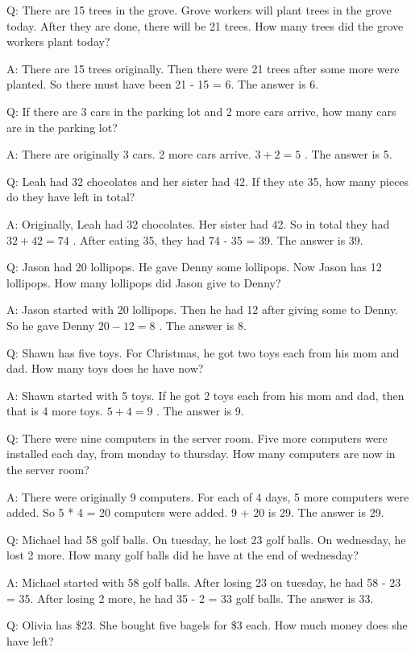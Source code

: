 \documentclass[
]{article}
\begin{document}
Q: There are 15 trees in the grove. Grove workers will plant trees in
the grove today. After they are done, there will be 21 trees. How many
trees did the grove workers plant today?

A: There are 15 trees originally. Then there were 21 trees after some
more were planted. So there must have been 21 - 15 = 6. The answer is 6.

Q: If there are 3 cars in the parking lot and 2 more cars arrive, how
many cars are in the parking lot?

A: There are originally 3 cars. 2 more cars arrive. \(3 + 2 = 5\) . The
answer is 5.

Q: Leah had 32 chocolates and her sister had 42. If they ate 35, how
many pieces do they have left in total?

A: Originally, Leah had 32 chocolates. Her sister had 42. So in total
they had \(32 + 42 = 74\) . After eating 35, they had 74 - 35 = 39. The
answer is 39.

Q: Jason had 20 lollipops. He gave Denny some lollipops. Now Jason has
12 lollipops. How many lollipops did Jason give to Denny?

A: Jason started with 20 lollipops. Then he had 12 after giving some to
Denny. So he gave Denny \(20 - 12 = 8\) . The answer is 8.

Q: Shawn has five toys. For Christmas, he got two toys each from his mom
and dad. How many toys does he have now?

A: Shawn started with 5 toys. If he got 2 toys each from his mom and
dad, then that is 4 more toys. \(5 + 4 = 9\) . The answer is 9.

Q: There were nine computers in the server room. Five more computers
were installed each day, from monday to thursday. How many computers are
now in the server room?

A: There were originally 9 computers. For each of 4 days, 5 more
computers were added. So 5 * 4 = 20 computers were added. 9 + 20 is 29.
The answer is 29.

Q: Michael had 58 golf balls. On tuesday, he lost 23 golf balls. On
wednesday, he lost 2 more. How many golf balls did he have at the end of
wednesday?

A: Michael started with 58 golf balls. After losing 23 on tuesday, he
had 58 - 23 = 35. After losing 2 more, he had 35 - 2 = 33 golf balls.
The answer is 33.

Q: Olivia has \$23. She bought five bagels for \$3 each. How much money
does she have left?
\end{document}
